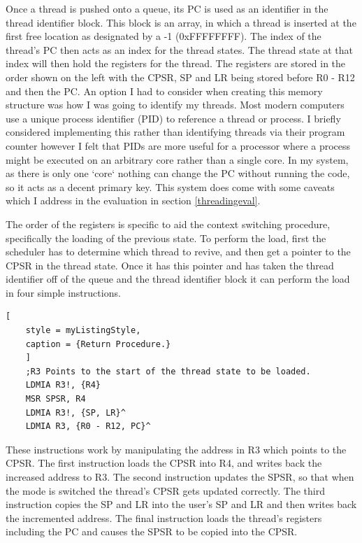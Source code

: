 Once a thread is pushed onto a queue, its PC is used as an identifier in the thread identifier block. This block is an array, in which a thread is inserted at the first free location as designated by a -1 (0xFFFFFFFF). The index of the thread's PC then acts as an index for the thread states. The thread state at that index will then hold the registers for the thread. The registers are stored in the order shown on the left with the CPSR, SP and LR being stored before R0 - R12 and then the PC. An option I had to consider when creating this memory structure was how I was going to identify my threads. Most modern computers use a unique process identifier (PID) to reference a thread or process. %
I briefly considered implementing this rather than identifying threads via their program counter however I felt that PIDs are more useful for a processor where a process might be executed on an arbitrary core rather than a single core. In my system, as there is only one `core` nothing can change the PC without running the code, so it acts as a decent primary key. This system does come with some caveats which I address in the evaluation in section \ref{threadingeval}.

The order of the registers is specific to aid the context switching procedure, specifically the loading of the previous state. To perform the load, first the scheduler has to determine which thread to revive, and then get a pointer to the CPSR in the thread state. Once it has this pointer and has taken the thread identifier off of the queue and the thread identifier block it can perform the load in four simple instructions.

\begin{lstlisting}[
	style = myListingStyle,
	caption = {Return Procedure.}
	]
	;R3 Points to the start of the thread state to be loaded.
	LDMIA R3!, {R4}
	MSR SPSR, R4
	LDMIA R3!, {SP, LR}^
	LDMIA R3, {R0 - R12, PC}^
\end{lstlisting}

These instructions work by manipulating the address in R3 which points to the CPSR. The first instruction loads the CPSR into R4, and writes back the increased address to R3. The second instruction updates the SPSR, so that when the mode is switched the thread's CPSR gets updated correctly. The third instruction copies the SP and LR into the user's SP and LR and then writes back the incremented address. The final instruction loads the thread's registers including the PC and causes the SPSR to be copied into the CPSR.


